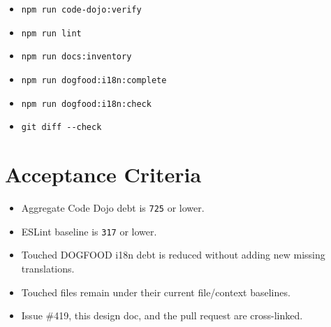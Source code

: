\begin{itemize}
\item
  \texttt{n\allowbreak{}p\allowbreak{}m\allowbreak{} \allowbreak{}r\allowbreak{}u\allowbreak{}n\allowbreak{} \allowbreak{}c\allowbreak{}o\allowbreak{}d\allowbreak{}e\allowbreak{}-\allowbreak{}d\allowbreak{}o\allowbreak{}j\allowbreak{}o\allowbreak{}:\allowbreak{}v\allowbreak{}e\allowbreak{}r\allowbreak{}i\allowbreak{}f\allowbreak{}y}
\item
  \texttt{n\allowbreak{}p\allowbreak{}m\allowbreak{} \allowbreak{}r\allowbreak{}u\allowbreak{}n\allowbreak{} \allowbreak{}l\allowbreak{}i\allowbreak{}n\allowbreak{}t}
\item
  \texttt{n\allowbreak{}p\allowbreak{}m\allowbreak{} \allowbreak{}r\allowbreak{}u\allowbreak{}n\allowbreak{} \allowbreak{}d\allowbreak{}o\allowbreak{}c\allowbreak{}s\allowbreak{}:\allowbreak{}i\allowbreak{}n\allowbreak{}v\allowbreak{}e\allowbreak{}n\allowbreak{}t\allowbreak{}o\allowbreak{}r\allowbreak{}y}
\item
  \texttt{n\allowbreak{}p\allowbreak{}m\allowbreak{} \allowbreak{}r\allowbreak{}u\allowbreak{}n\allowbreak{} \allowbreak{}d\allowbreak{}o\allowbreak{}g\allowbreak{}f\allowbreak{}o\allowbreak{}o\allowbreak{}d\allowbreak{}:\allowbreak{}i\allowbreak{}1\allowbreak{}8\allowbreak{}n\allowbreak{}:\allowbreak{}c\allowbreak{}o\allowbreak{}m\allowbreak{}p\allowbreak{}l\allowbreak{}e\allowbreak{}t\allowbreak{}e}
\item
  \texttt{n\allowbreak{}p\allowbreak{}m\allowbreak{} \allowbreak{}r\allowbreak{}u\allowbreak{}n\allowbreak{} \allowbreak{}d\allowbreak{}o\allowbreak{}g\allowbreak{}f\allowbreak{}o\allowbreak{}o\allowbreak{}d\allowbreak{}:\allowbreak{}i\allowbreak{}1\allowbreak{}8\allowbreak{}n\allowbreak{}:\allowbreak{}c\allowbreak{}h\allowbreak{}e\allowbreak{}c\allowbreak{}k}
\item
  \texttt{g\allowbreak{}i\allowbreak{}t\allowbreak{} \allowbreak{}d\allowbreak{}i\allowbreak{}f\allowbreak{}f\allowbreak{} \allowbreak{}-\allowbreak{}-\allowbreak{}c\allowbreak{}h\allowbreak{}e\allowbreak{}c\allowbreak{}k}
\end{itemize}

\section{Acceptance Criteria}\label{record-199-acceptance-criteria}

\begin{itemize}
\tightlist
\item
  Aggregate Code Dojo debt is \texttt{7\allowbreak{}2\allowbreak{}5} or lower.
\item
  ESLint baseline is \texttt{3\allowbreak{}1\allowbreak{}7} or lower.
\item
  Touched DOGFOOD i18n debt is reduced without adding new missing translations.
\item
  Touched files remain under their current file/context baselines.
\item
  Issue \#419, this design doc, and the pull request are cross-linked.
\end{itemize}

